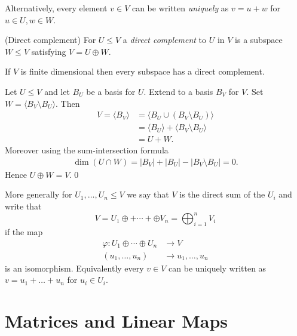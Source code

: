 \documentclass{article}
\begin{document}
Alternatively, every element $ v\in V $ can be written \textit{uniquely} as $ v=u+w $ for $ u\in U, w\in W $.
\begin{definition}
	(Direct complement) For $ U\le V $ a \textit{direct complement} to $ U $ in $ V $ is a subspace $ W\le V $ satisfying $ V=U\oplus W $.
\end{definition}
\begin{proposition}
  If $ V $ is finite dimensional then every subspace has a direct complement.
\end{proposition}
\pf Let $ U\le V $ and let $ B_U $ be a basis for $ U $. Extend to a basis $ B_V $ for $ V $. Set $ W=\langle B_V\setminus B_U\rangle $. Then
\begin{align*}
	V=\langle B_V\rangle &= \langle B_U\cup (B_V\setminus B_U)\rangle\\
			     &= \langle B_U\rangle + \langle B_V\setminus B_U\rangle \\
			     &=U+W.
\end{align*}
Moreover using the sum-intersection formula
\begin{align*}
	\dim (U\cap W)=|B_V|+|B_U|-|B_V\setminus B_U|=0.
\end{align*}
Hence $ U\oplus W=V $.\qed\par
More generally for $ U_1,\dots, U_n\le V $ we say that $ V $ is the direct sum of the $ U_i $ and write that
\[
	V=U_1\oplus+\cdots +\oplus V_n=\bigoplus_{i=1}^n V_i
\]
if the map
\begin{align*}
	\varphi: U_1\oplus\cdots\oplus U_n &\to V\\
	(u_1,\dots, u_n) &\to u_1,\dots, u_n
\end{align*}
is an isomorphism. Equivalently every $ v\in V $ can be uniquely written as $ v=u_1+\dots +u_n $ for $ u_i\in U_i $.
\section{Matrices and Linear Maps}
\end{document}
